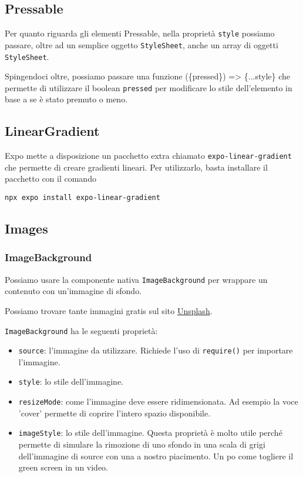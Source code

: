 \documentclass[12pt]{article}
\begin{document}
\subsection{Pressable}
Per quanto riguarda gli elementi Pressable, nella proprietà 
\texttt{style} possiamo passare, oltre ad un semplice oggetto
\texttt{StyleSheet}, anche un array di oggetti \texttt{StyleSheet}.

Spingendoci oltre, possiamo passare una funzione (\{pressed\}) => \{...style\} che
permette di utilizzare il boolean \texttt{pressed} per modificare lo stile
dell'elemento in base a se è stato premuto o meno.

\subsection{LinearGradient}
Expo mette a disposizione un pacchetto extra chiamato \texttt{expo-linear-gradient}
che permette di creare gradienti lineari. Per utilizzarlo, basta installare il pacchetto
con il comando
\begin{highlight}
\begin{verbatim}
npx expo install expo-linear-gradient
\end{verbatim}
\end{highlight}


\subsection{Images}
\subsubsection{ImageBackground}
Possiamo usare la componente nativa \texttt{ImageBackground} 
per wrappare un contenuto con un'immagine di sfondo.

Possiamo trovare tante immagini gratis sul sito 
\href{https://unsplash.com/}{Unsplash}.

\texttt{ImageBackground} ha le seguenti proprietà:
\begin{itemize}
\item \texttt{source}: l'immagine da utilizzare. Richiede l'uso di 
\texttt{require()} per importare l'immagine.
\item \texttt{style}: lo stile dell'immagine.
\item \texttt{resizeMode}: come l'immagine deve essere ridimensionata.
Ad esempio la voce 'cover' permette di coprire l'intero spazio disponibile.
\item \texttt{imageStyle}: lo stile dell'immagine. 
Questa proprietà è molto utile perché permette di 
simulare la rimozione di uno sfondo in una scala di grigi 
dell'immagine di source con una a nostro piacimento.
Un po come togliere il green screen in un video.
\end{itemize}
\end{document}
